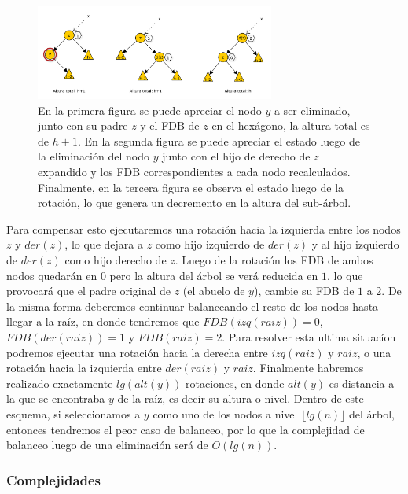 \begin{figure}
 \centering
 \includegraphics[width=0.70\textwidth]{graficos/PeorCasoEliminacionAVL.pdf}
 \caption*{\newline \footnotesize En la primera figura se puede apreciar el nodo $y$ a ser eliminado, junto con su padre $z$ y el FDB de $z$ en el hex\'agono, la altura total es de $h+1$. En la segunda figura se puede apreciar el estado luego de la eliminaci\'on del nodo $y$ junto con el hijo de derecho de $z$ expandido y los FDB correspondientes a cada nodo recalculados. Finalmente, en la tercera figura se observa el estado luego de la rotaci\'on, lo que genera un decremento en la altura del sub-\'arbol.}
\end{figure}

Para compensar esto ejecutaremos una rotaci\'on hacia la izquierda entre los nodos $z$ y $der(z)$, lo que dejara a $z$ como hijo izquierdo de $der(z)$ y al hijo izquierdo de $der(z)$ como hijo derecho de $z$. Luego de la rotaci\'on los FDB de ambos nodos quedar\'an en $0$ pero la altura del \'arbol se ver\'a reducida en $1$, lo que provocar\'a que el padre original de $z$ (el abuelo de $y$), cambie su FDB de $1$ a $2$. De la misma forma deberemos continuar balanceando el resto de los nodos hasta llegar a la ra\'iz, en donde tendremos que $FDB(izq(raiz)) = 0$, $FDB(der(raiz)) = 1$ y $FDB(raiz) = 2$. Para resolver esta ultima situac\'ion podremos ejecutar una rotaci\'on hacia la derecha entre $izq(raiz)$ y $raiz$, o una rotaci\'on hacia la izquierda entre $der(raiz)$ y $raiz$. Finalmente habremos realizado exactamente $lg(alt(y))$ rotaciones, en donde $alt(y)$ es distancia a la que se encontraba $y$ de la ra\'iz, es decir su altura o nivel. Dentro de este esquema, si seleccionamos a $y$ como uno de los nodos a 
nivel $\lfloor lg(n) \rfloor$ del \'arbol, entonces tendremos el peor caso de balanceo, por lo que la complejidad de balanceo luego de una eliminaci\'on ser\'a de $O(lg(n))$.

\subsubsection{Complejidades}

